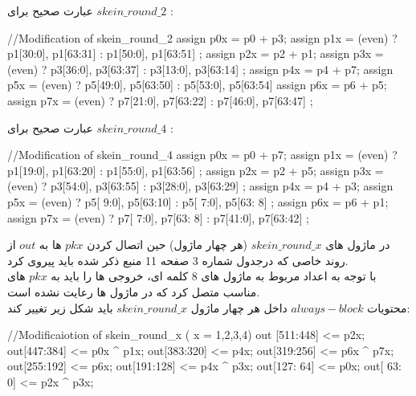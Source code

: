  عبارت صحیح برای $skein\_round\_2$ :
 \begin{code}
 	//Modification of skein_round_2
 	assign p0x = p0 + p3;
	assign p1x = (even) ? { p1[30:0], p1[63:31] } : { p1[50:0], p1[63:51] };
	assign p2x = p2 + p1;
	assign p3x = (even) ? { p3[36:0], p3[63:37] } : { p3[13:0], p3[63:14] };
	assign p4x = p4 + p7;
	assign p5x = (even) ? { p5[49:0], p5[63:50] } : { p5[53:0], p5[63:54] }
	assign p6x = p6 + p5;
	assign p7x = (even) ? { p7[21:0], p7[63:22] } : { p7[46:0], p7[63:47] };
 \end{code}
  عبارت صحیح برای $skein\_round\_4$ :
\begin{code}
	//Modification of skein_round_4
	assign p0x = p0 + p7;
	assign p1x = (even) ? { p1[19:0], p1[63:20] } : { p1[55:0], p1[63:56] };
	assign p2x = p2 + p5;
	assign p3x = (even) ? { p3[54:0], p3[63:55] } : { p3[28:0], p3[63:29] };
	assign p4x = p4 + p3;
	assign p5x = (even) ? { p5[ 9:0], p5[63:10] } : { p5[ 7:0], p5[63: 8] };
	assign p6x = p6 + p1;
	assign p7x = (even) ? { p7[ 7:0], p7[63: 8] } : { p7[41:0], p7[63:42] };
\end{code}
در ماژول های $skein\_round\_x$ (هر چهار ماژول) حین اتصال کردن $pkx$ ها به $out$ از روند خاصی که درجدول شماره 3 صفحه 11 منبع ذکر شده باید پیروی کرد.\\
با توجه به اعداد مربوط به ماژول های 8 کلمه ای، خروجی ها را باید به $pkx$ های مناسب متصل کرد که در ماژول ها رعایت نشده است.\\
محتویات $always-block$ داخل هر چهار ماژول $skein\_round\_x$ باید شکل زیر تغییر کند:
\begin{code}
	//Modificaiotion of skein_round_x ( x = 1,2,3,4)	
	out [511:448] <= p2x;
	out[447:384] <= p0x ^ p1x;
	out[383:320] <= p4x;
	out[319:256] <= p6x ^ p7x;
	out[255:192] <= p6x;
	out[191:128] <= p4x ^ p3x;
	out[127: 64] <= p0x;
	out[ 63:  0] <= p2x ^ p3x;
\end{code}
